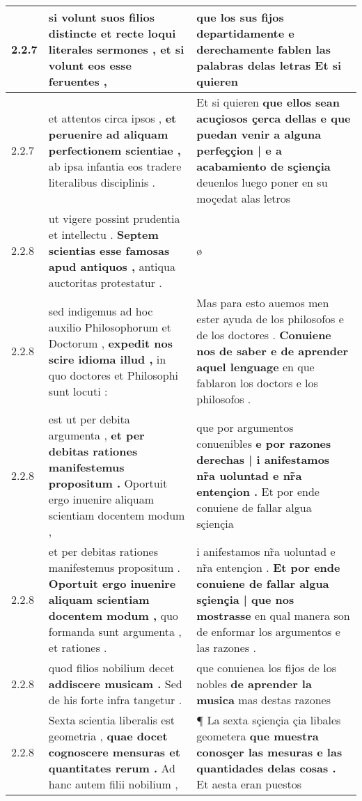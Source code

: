 \begin{tabular}{|p{1cm}|p{6.5cm}|p{6.5cm}|}
2.2.7 & si volunt suos filios distincte \textbf{ et recte loqui literales sermones , } et si volunt eos esse feruentes , & que los sus fijos departidamente \textbf{ e derechamente fablen las palabras delas letras } Et si quieren \\\hline
2.2.7 & et attentos circa ipsos , \textbf{ et peruenire ad aliquam perfectionem scientiae , } ab ipsa infantia eos tradere literalibus disciplinis . & Et si quieren \textbf{ que ellos sean acuçiosos çerca dellas e que puedan venir a alguna perfeççion | e a acabamiento de sçiençia } deuenlos luego poner en su moçedat alas letros \\\hline
2.2.8 & ut vigere possint prudentia et intellectu . \textbf{ Septem scientias esse famosas apud antiquos , } antiqua auctoritas protestatur . & ø \\\hline
2.2.8 & sed indigemus ad hoc auxilio Philosophorum et Doctorum , \textbf{ expedit nos scire idioma illud , } in quo doctores et Philosophi sunt locuti : & Mas para esto auemos men ester ayuda de los philosofos e de los doctores . \textbf{ Conuiene nos de saber e de aprender aquel lenguage } en que fablaron los doctors e los philosofos . \\\hline
2.2.8 & est ut per debita argumenta , \textbf{ et per debitas rationes manifestemus propositum . } Oportuit ergo inuenire aliquam scientiam docentem modum , & que por argumentos conuenibles \textbf{ e por razones derechas | i anifestamos nr̃a uoluntad e nr̃a entençion . } Et por ende conuiene de fallar algua sçiençia \\\hline
2.2.8 & et per debitas rationes manifestemus propositum . \textbf{ Oportuit ergo inuenire aliquam scientiam docentem modum , } quo formanda sunt argumenta , et rationes . & i anifestamos nr̃a uoluntad e nr̃a entençion . \textbf{ Et por ende conuiene de fallar algua sçiençia | que nos mostrasse } en qual manera son de enformar los argumentos e las razones . \\\hline
2.2.8 & quod filios nobilium decet \textbf{ addiscere musicam . } Sed de his forte infra tangetur . & que conuienea los fijos de los nobles \textbf{ de aprender la musica } mas destas razones \\\hline
2.2.8 & Sexta scientia liberalis est geometria , \textbf{ quae docet cognoscere mensuras et quantitates rerum . } Ad hanc autem filii nobilium , & ¶ La sexta sçiençia çia libales geometera \textbf{ que muestra conosçer las mesuras e las quantidades delas cosas . } Et aesta eran puestos \\\hline

\end{tabular}
